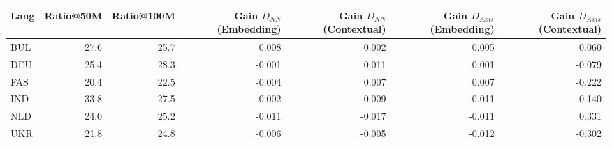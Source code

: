\begin{tabular}{@{}lrrrrrr@{}}
\toprule
Lang & Ratio@50M & Ratio@100M & Gain $D_{NN}$ (Embedding) & Gain $D_{NN}$ (Contextual) & Gain $D_{Axis}$ (Embedding) & Gain $D_{Axis}$ (Contextual) \\
\midrule
BUL & 27.6 & 25.7 & 0.008 & 0.002 & 0.005 & 0.060 \\
DEU & 25.4 & 28.3 & -0.001 & 0.011 & 0.001 & -0.079 \\
FAS & 20.4 & 22.5 & -0.004 & 0.007 & 0.007 & -0.222 \\
IND & 33.8 & 27.5 & -0.002 & -0.009 & -0.011 & 0.140 \\
NLD & 24.0 & 25.2 & -0.011 & -0.017 & -0.011 & 0.331 \\
UKR & 21.8 & 24.8 & -0.006 & -0.005 & -0.012 & -0.302 \\
\bottomrule
\end{tabular}
